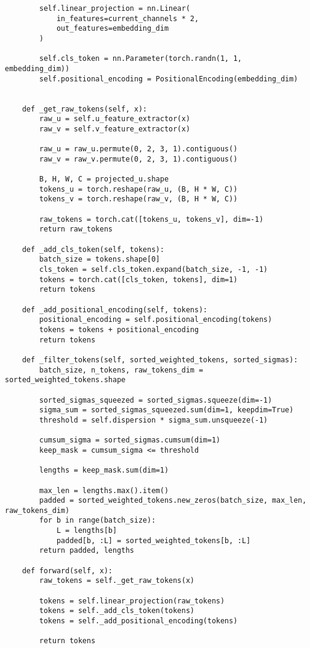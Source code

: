 {\begin{verbatim}
        self.linear_projection = nn.Linear(
            in_features=current_channels * 2,
            out_features=embedding_dim
        )

        self.cls_token = nn.Parameter(torch.randn(1, 1, embedding_dim))
        self.positional_encoding = PositionalEncoding(embedding_dim)


    def _get_raw_tokens(self, x):
        raw_u = self.u_feature_extractor(x)
        raw_v = self.v_feature_extractor(x)

        raw_u = raw_u.permute(0, 2, 3, 1).contiguous()
        raw_v = raw_v.permute(0, 2, 3, 1).contiguous()

        B, H, W, C = projected_u.shape
        tokens_u = torch.reshape(raw_u, (B, H * W, C))
        tokens_v = torch.reshape(raw_v, (B, H * W, C))

        raw_tokens = torch.cat([tokens_u, tokens_v], dim=-1)
        return raw_tokens

    def _add_cls_token(self, tokens):
        batch_size = tokens.shape[0]
        cls_token = self.cls_token.expand(batch_size, -1, -1)
        tokens = torch.cat([cls_token, tokens], dim=1)
        return tokens

    def _add_positional_encoding(self, tokens):
        positional_encoding = self.positional_encoding(tokens)
        tokens = tokens + positional_encoding
        return tokens

    def _filter_tokens(self, sorted_weighted_tokens, sorted_sigmas):
        batch_size, n_tokens, raw_tokens_dim = sorted_weighted_tokens.shape

        sorted_sigmas_squeezed = sorted_sigmas.squeeze(dim=-1)
        sigma_sum = sorted_sigmas_squeezed.sum(dim=1, keepdim=True)
        threshold = self.dispersion * sigma_sum.unsqueeze(-1)

        cumsum_sigma = sorted_sigmas.cumsum(dim=1)
        keep_mask = cumsum_sigma <= threshold

        lengths = keep_mask.sum(dim=1)

        max_len = lengths.max().item()
        padded = sorted_weighted_tokens.new_zeros(batch_size, max_len, raw_tokens_dim)
        for b in range(batch_size):
            L = lengths[b]
            padded[b, :L] = sorted_weighted_tokens[b, :L]
        return padded, lengths

    def forward(self, x):
        raw_tokens = self._get_raw_tokens(x)

        tokens = self.linear_projection(raw_tokens)
        tokens = self._add_cls_token(tokens)
        tokens = self._add_positional_encoding(tokens)

        return tokens


\end{verbatim}
}

